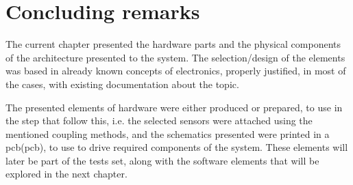 \section{Concluding remarks}
The current chapter presented the hardware parts and the physical components of the architecture presented to the system. The selection/design of the elements was based in already known concepts of electronics, properly justified, in most of the cases, with existing documentation about the topic.

The presented elements of hardware were either produced or prepared, to use in the step that follow this, i.e. the selected sensors were attached using the mentioned coupling methods, and the schematics presented were printed in a \acrshort{pcb}(\acrlong{pcb}), to use to drive required components of the system. These elements will later be part of the tests set, along with the software elements that will be explored in the next chapter.

\clearpage